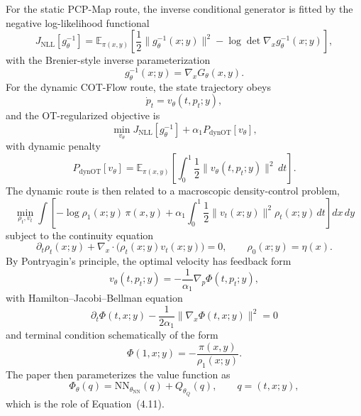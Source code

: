 \documentclass[11pt]{report}
\newcommand{\E}{\mathbb{E}}
\begin{document}
For the static PCP-Map route, the inverse conditional generator is fitted by the
negative log-likelihood functional
\begin{equation}
J_{\mathrm{NLL}}[g_\theta^{-1}]
=
\E_{\pi(x,y)}
\left[
\frac12\|g_\theta^{-1}(x;y)\|^2
- \log\det \nabla_x g_\theta^{-1}(x;y)
\right],
\label{eq:wang-nll}
\end{equation}
with the Brenier-style inverse parameterization
\begin{equation}
g_\theta^{-1}(x;y)=\nabla_x G_\theta(x,y).
\label{eq:wang-inverse-brenier}
\end{equation}
For the dynamic COT-Flow route, the state trajectory obeys
\begin{equation}
\dot p_t = v_\theta(t,p_t;y),
\label{eq:wang-flow-ode}
\end{equation}
and the OT-regularized objective is
\begin{equation}
\min_{v_\theta} J_{\mathrm{NLL}}[g_\theta^{-1}] + \alpha_1 P_{\mathrm{dynOT}}[v_\theta],
\label{eq:wang-flow-objective}
\end{equation}
with dynamic penalty
\begin{equation}
P_{\mathrm{dynOT}}[v_\theta]
=
\E_{\pi(x,y)}\left[\int_0^1 \frac12\|v_\theta(t,p_t;y)\|^2\,dt\right].
\label{eq:wang-dynot-penalty}
\end{equation}
The dynamic route is then related to a macroscopic density-control problem,
\begin{equation}
\min_{\rho_t,v_t}
\int \left[
-\log \rho_1(x;y)\,\pi(x,y)
+
\alpha_1\int_0^1 \frac12\|v_t(x;y)\|^2\rho_t(x;y)\,dt
\right]dx\,dy
\label{eq:wang-mfg-schematic}
\end{equation}
subject to the continuity equation
\begin{equation}
\partial_t \rho_t(x;y)+\nabla_x\cdot\bigl(\rho_t(x;y)v_t(x;y)\bigr)=0,
\qquad
\rho_0(x;y)=\eta(x).
\label{eq:wang-continuity}
\end{equation}
By Pontryagin's principle, the optimal velocity has feedback form
\begin{equation}
v_\theta(t,p_t;y) = -\frac{1}{\alpha_1}\nabla_p \Phi(t,p_t;y),
\label{eq:wang-flow-feedback}
\end{equation}
with Hamilton--Jacobi--Bellman equation
\begin{equation}
\partial_t \Phi(t,x;y)-\frac{1}{2\alpha_1}\|\nabla_x\Phi(t,x;y)\|^2=0
\label{eq:wang-hjb}
\end{equation}
and terminal condition schematically of the form
\begin{equation}
\Phi(1,x;y) = -\frac{\pi(x,y)}{\rho_1(x;y)}.
\label{eq:wang-terminal}
\end{equation}
The paper then parameterizes the value function as
\begin{equation}
\Phi_\theta(q)=\mathrm{NN}_{\theta_{\mathrm{NN}}}(q)+Q_{\theta_Q}(q),
\qquad q=(t,x;y),
\label{eq:wang-value-net}
\end{equation}
which is the role of Equation~(4.11).
\end{document}
